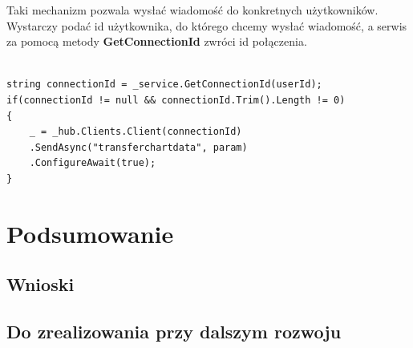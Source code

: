 \documentclass[12pt,a4paper]{article}
\begin{document}
Taki mechanizm pozwala wysłać wiadomość do konkretnych użytkowników. Wystarczy podać id użytkownika, do którego chcemy wysłać wiadomość, a serwis za pomocą metody \textbf{GetConnectionId} zwróci id połączenia.

\begin{lstlisting}[caption={Przykład wysyłania wiadomości do danego użytkownika.}]

string connectionId = _service.GetConnectionId(userId);
if(connectionId != null && connectionId.Trim().Length != 0)
{
	_ = _hub.Clients.Client(connectionId)
	.SendAsync("transferchartdata", param)
	.ConfigureAwait(true);
}

\end{lstlisting}

\section{Podsumowanie}

\subsection{Wnioski}
\subsection{Do zrealizowania przy dalszym rozwoju}
\end{document}
